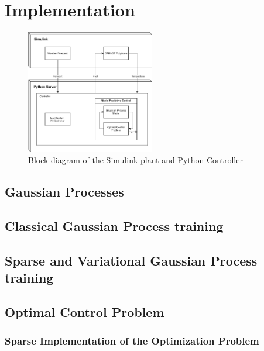 \section{Implementation}


\begin{figure}[ht]
    \centering
    \includegraphics[width = 0.5\textwidth]{Images/setup_diagram.pdf}
    \caption{Block diagram of the Simulink plant and Python Controller}
    \label{fig:setup_diagram}
\end{figure}



\subsection{Gaussian Processes}


\subsection{Classical Gaussian Process training}
\subsection{Sparse and Variational Gaussian Process training}


\subsection{Optimal Control Problem}
\subsubsection{Sparse Implementation of the Optimization Problem}

